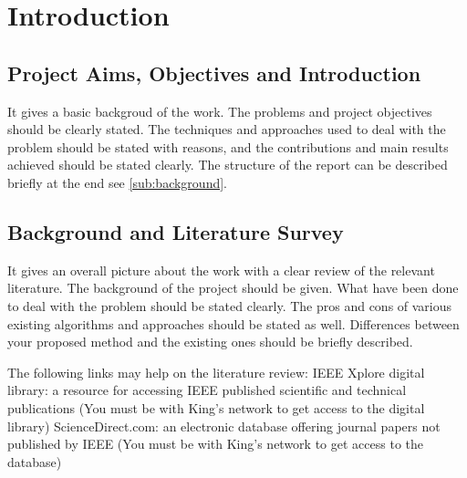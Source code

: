 \section{Introduction}
\subsection{Project Aims, Objectives and Introduction} 
It gives a basic backgroud of the work.  The problems and project objectives should be clearly stated.  The techniques and approaches used to deal with the problem should be stated with reasons, and the contributions and main results achieved should be stated clearly.  The structure of the report can be described briefly at the end see \autoref{sub:background}.
\subsection{Background and Literature Survey} \label{sub:background}
 It gives an overall picture about the work with a clear review of the relevant literature.  The background of the project should be given.  What have been done to deal with the problem should be stated clearly.  The pros and cons of various existing algorithms and approaches should be stated as well.  Differences between your proposed method and the existing ones should be briefly described.

The following links may help on the literature review:
IEEE Xplore digital library: a resource for accessing IEEE published scientific and technical publications (You must be with King's network to get access to the digital library)
ScienceDirect.com: an electronic database offering journal papers not published by IEEE (You must be with King's network to get access to the database)